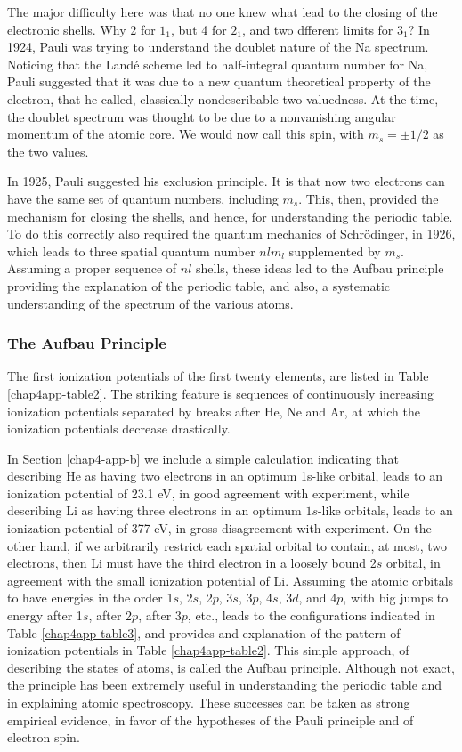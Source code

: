 The major difficulty here was that no one knew what lead to the 
closing of the electronic shells.  Why 2 for $1_1$, but 4 for $2_1$, and 
two dfferent limits for $3_1$?  In 1924, Pauli was trying to understand the 
doublet nature of the Na spectrum.  Noticing that the
Land\'e scheme led to half-integral quantum number for Na, Pauli suggested 
that it was due to a new quantum theoretical property of the electron, 
that he called, classically nondescribable two-valuedness.  At the time, 
the doublet spectrum was thought to be due to a nonvanishing angular 
momentum of the atomic core.  We would now call this spin, with 
$m_s = \pm 1/2$ as the two values.

In 1925, Pauli suggested his exclusion principle.  It is that now two 
electrons can have the same set of quantum numbers, including $m_s$.  
This, then, provided the mechanism for closing the shells, and hence, for 
understanding the periodic table.  To do
this correctly also required the quantum mechanics of Schr\"odinger, in 1926, 
which leads to three spatial quantum number $nlm_l$ supplemented by 
$m_s$.  Assuming a proper sequence of $nl$ shells, these ideas led to 
the Aufbau principle providing the explanation of the periodic table, 
and also, a systematic understanding of the spectrum of the various 
atoms.

\subsubsection{The Aufbau Principle}

The first ionization potentials of the first twenty elements, are
listed in Table \ref{chap4app-table2}.  The striking feature is
sequences of continuously increasing ionization potentials separated
by breaks after He, Ne and Ar, at which the ionization potentials
decrease drastically.

In Section \ref{chap4-app-b} we include a simple calculation
indicating that describing He as having two electrons in an optimum
1s-like orbital, leads to an ionization potential of 23.1 eV, in good
agreement with experiment, while describing Li as having three
electrons in an optimum $1s$-like orbitals, leads to an ionization
potential of 377 eV, in gross disagreement with experiment.  On the
other hand, if we arbitrarily restrict each spatial orbital to
contain, at most, two electrons, then Li must have the third electron
in a loosely bound 2$s$ orbital, in agreement with the small
ionization potential of Li.  Assuming the atomic orbitals to have
energies in the order 1$s$, 2$s$, 2$p$, 3$s$, 3$p$, 4$s$, 3$d$, and
4$p$, with big jumps to energy after 1$s$, after 2$p$, after 3$p$,
etc., leads to the configurations indicated in Table
\ref{chap4app-table3}, and provides and explanation of the pattern of
ionization potentials in Table \ref{chap4app-table2}.  This simple
approach, of describing the states of atoms, is called the Aufbau
principle.  Although not exact, the principle has been extremely
useful in understanding the periodic table and in explaining atomic
spectroscopy.  These successes can be taken as strong empirical
evidence, in favor of the hypotheses of the Pauli principle and of
electron spin.


